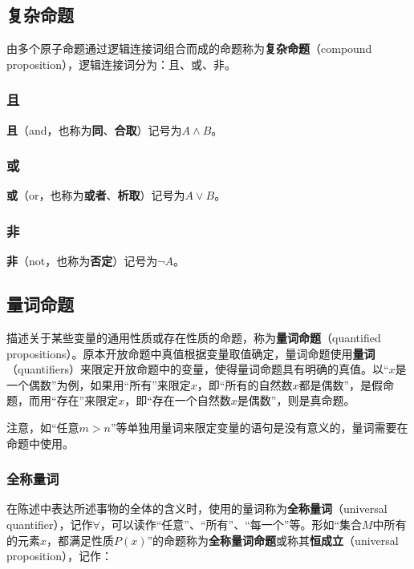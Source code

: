 \subsection{复杂命题}\label{sub_HsLogi_1}

由多个原子命题通过逻辑连接词组合而成的命题称为\textbf{复杂命题}（compound proposition），逻辑连接词分为：且、或、非。

\subsubsection{且}

\textbf{且}（and，也称为\textbf{同}、\textbf{合取}）记号为$A\land B$。

\subsubsection{或}

\textbf{或}（or，也称为\textbf{或者}、\textbf{析取}）记号为$A\lor B$。

\subsubsection{非}

\textbf{非}（not，也称为\textbf{否定}）记号为$\lnot A$。

\subsection{量词命题}

描述关于某些变量的通用性质或存在性质的命题，称为\textbf{量词命题}（quantified propositions）。原本开放命题中真值根据变量取值确定，量词命题使用\textbf{量词}（quantifiers）来限定开放命题中的变量，使得量词命题具有明确的真值。以“$x$是一个偶数”为例，如果用“所有”来限定$x$，即“所有的自然数$x$都是偶数”，是假命题，而用“存在”来限定$x$，即“存在一个自然数$x$是偶数”，则是真命题。

注意，如“任意$m>n$”等单独用量词来限定变量的语句是没有意义的，量词需要在命题中使用。

\subsubsection{全称量词}

在陈述中表达所述事物的全体的含义时，使用的量词称为\textbf{全称量词}（universal quantifier），记作$\forall$，可以读作“任意”、“所有”、“每一个”等。形如“集合$M$中所有的元素$x$，都满足性质$P(x)$”的命题称为\textbf{全称量词命题}或称其\textbf{恒成立}（universal proposition），记作：


